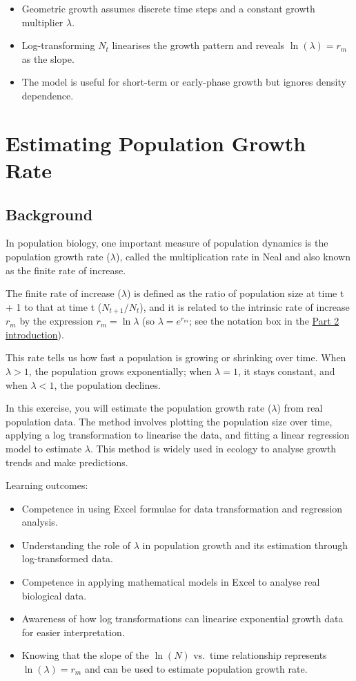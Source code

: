 \documentclass[
  a4paper]{book}
\providecommand{\tightlist}{%
  \setlength{\itemsep}{0pt}\setlength{\parskip}{0pt}}
\begin{document}
\begin{itemize}
\tightlist
\item
  Geometric growth assumes discrete time steps and a constant growth multiplier \(\lambda\).
\item
  Log-transforming \(N_t\) linearises the growth pattern and reveals \(\ln(\lambda) = r_m\) as the slope.
\item
  The model is useful for short-term or early-phase growth but ignores density dependence.
\end{itemize}

\chapter{Estimating Population Growth Rate}\label{estimating-population-growth-rate}

\section{Background}\label{background-3}

In population biology, one important measure of population dynamics is the population growth rate (\(\lambda\)), called the multiplication rate in Neal and also known as the finite rate of increase.

The finite rate of increase (\(\lambda\)) is defined as the ratio of population size at time t + 1 to that at time t (\(N_{t+1}/N_t\)), and it is related to the intrinsic rate of increase \(r_m\) by the expression \(r_m = \ln \lambda\) (so \(\lambda = e^{r_m}\); see the notation box in the \hyperref[part-2]{Part 2 introduction}).

This rate tells us how fast a population is growing or shrinking over time. When \(\lambda > 1\), the population grows exponentially; when \(\lambda = 1\), it stays constant, and when \(\lambda < 1\), the population declines.

In this exercise, you will estimate the population growth rate (\(\lambda\)) from real population data. The method involves plotting the population size over time, applying a log transformation to linearise the data, and fitting a linear regression model to estimate \(\lambda\). This method is widely used in ecology to analyse growth trends and make predictions.

Learning outcomes:

\begin{itemize}
\tightlist
\item
  Competence in using Excel formulae for data transformation and regression analysis.
\item
  Understanding the role of \(\lambda\) in population growth and its estimation through log-transformed data.
\item
  Competence in applying mathematical models in Excel to analyse real biological data.
\item
  Awareness of how log transformations can linearise exponential growth data for easier interpretation.
\item
  Knowing that the slope of the \(\ln(N)\) vs.~time relationship represents \(\ln(\lambda) = r_m\) and can be used to estimate population growth rate.
\end{itemize}
\end{document}
